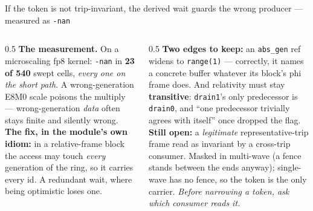 \documentclass[aspectratio=169,9pt]{beamer}
\newcommand{\key}[1]{\textcolor{acc}{\textbf{#1}}}
\newcommand{\bad}[1]{\textcolor{warn}{\textbf{#1}}}
\newcommand{\good}[1]{\textcolor{ok}{\textbf{#1}}}
\begin{document}
\begin{frame}{If the token is not trip-invariant, the derived wait guards the wrong producer --- measured as \texttt{-nan}}
\footnotesize
\begin{center}
\end{center}

\begin{columns}[T]
\begin{column}{0.5\textwidth}
\bad{The measurement.} On a microscaling fp8 kernel: \texttt{-nan} in \textbf{23 of 540} swept cells,
\emph{every one on the short path}. A wrong-generation E8M0 scale poisons the multiply --- wrong-generation
\emph{data} often stays finite and silently wrong.\\[3pt]
\good{The fix, in the module's own idiom:} in a relative-frame block the access may touch \emph{every}
generation of the ring, so it carries every id. A redundant wait, where being optimistic loses one.
\end{column}
\begin{column}{0.5\textwidth}
\textbf{Two edges to keep:} an \texttt{abs\_gen} ref widens to \texttt{range(1)} --- correctly, it names a
concrete buffer whatever its block's phi frame does. And relativity must stay \key{transitive}: \texttt{drain1}'s
only predecessor is \texttt{drain0}, and ``one predecessor trivially agrees with itself'' once dropped the flag.\\[3pt]
\bad{Still open:} a \emph{legitimate} representative-trip frame read as invariant by a cross-trip consumer. Masked
in multi-wave (a fence stands between the ends anyway); single-wave has no fence, so the token is the only carrier.
\emph{Before narrowing a token, ask which consumer reads it.}
\end{column}
\end{columns}
\end{frame}
\end{document}
